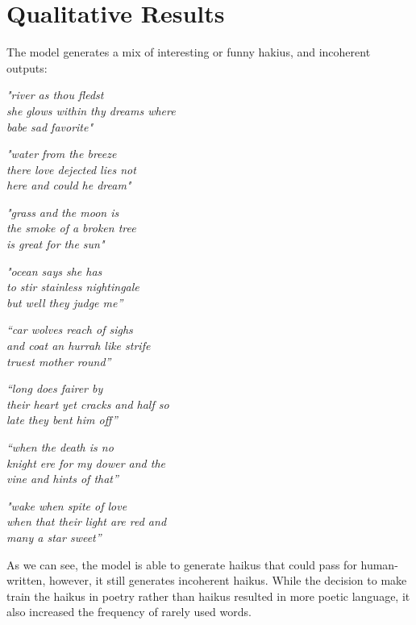 \documentclass{article} %
\begin{document}
\section{Qualitative Results}
The model generates a mix of interesting or funny hakius, and incoherent outputs:


\begin{multicols}{2}


  \textit{"river as thou fledst \\
  she glows within thy dreams where \\
  babe sad favorite"}

  \textit{"water from the breeze \\
  there love dejected lies not \\
  here and could he dream"}

  \textit{"grass and the moon is \\
  the smoke of a broken tree \\
  is great for the sun"}

  \textit{"ocean says she has \\
  to stir stainless nightingale \\
  but well they judge me”}


  \columnbreak

  \textit{“car wolves reach of sighs \\
  and coat an hurrah like strife \\
  truest mother round”}

  \textit{“long does fairer by \\
  their heart yet cracks and half so \\
  late they bent him off”}

  \textit{“when the death is no \\
  knight ere for my dower and the \\
  vine and hints of that”}

  \textit{"wake when spite of love \\
  when that their light are red and \\
  many a star sweet”}


\end{multicols}

As we can see, the model is able to generate haikus that could pass for human-written, however, it still generates
incoherent haikus.
While the decision to make train the haikus in poetry rather than haikus resulted in more poetic language,
it also increased the frequency of rarely used words.
\end{document}
